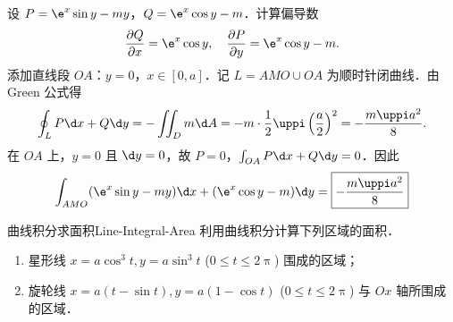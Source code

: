 \begin{solution}

    设 $P = \e^x \sin y - my$，$Q = \e^x \cos y - m$．计算偏导数
    \begin{equation}
        \frac{\partial Q}{\partial x} = \e^x \cos y, \quad \frac{\partial P}{\partial y} = \e^x \cos y - m.
    \end{equation}
    添加直线段 $OA$：$y=0$，$x \in [0, a]$．记 $L = AMO \cup OA$ 为顺时针闭曲线．由 Green 公式得
    \begin{equation}
        \oint_L P \d x + Q \d y = -\iint_D m \d A = -m \cdot \frac{1}{2} \uppi \left( \frac{a}{2} \right)^2 = -\frac{m \uppi a^2}{8}.
    \end{equation}
    在 $OA$ 上，$y=0$ 且 $\d y = 0$，故 $P = 0$，$\int_{OA} P \d x + Q \d y = 0$．因此
    \begin{equation}
        \int_{AMO} (\e^x \sin y - my) \d x + (\e^x \cos y - m) \d y = \boxed{-\frac{m \uppi a^2}{8}}
    \end{equation}
\end{solution}

\begin{problem}{曲线积分求面积}{Line-Integral-Area}
    利用曲线积分计算下列区域的面积．
    \begin{enumerate}
        \item 星形线 $x = a \cos^3 t, y = a \sin^3 t$ ($0 \le t \le 2\uppi$) 围成的区域；
        \item 旋轮线 $x = a(t - \sin t), y = a(1 - \cos t)$ ($0 \le t \le 2\uppi$) 与 $Ox$ 轴所围成的区域．
    \end{enumerate}
\end{problem}

